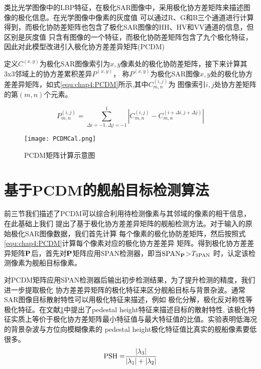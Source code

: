     类比光学图像中的LBP特征，在极化SAR图像中，采用极化协方差矩阵来描述图像的极化信息。在光学图像中像素的灰度值
    可以通过R、G和B三个通道进行计算得到，而极化协防差矩阵也包含了极化SAR图像的HH、HV和VV通道的信息，但区别是灰度值
    只含有图像的一个特征，而极化协防差矩阵包含了九个极化特征，因此对此模型改进引入极化协方差差异矩阵(PCDM)

    定义${C^{(x,y)}}$为极化SAR图像索引为$x,y$像素处的极化协防差矩阵，接下来计算其3x3邻域上的协方差累积差异$P^{(x,y)}$，
    称$P^{(x,y)}$为极化SAR图像$x,y$处的极化协方差差异矩阵，如式\ref{equ:chap4:PCDM}所示,其中$C_{m,n}^{(i,j)}$为
    图像索引$i,j$处协方差矩阵的第$(m,n)$个元素。

    \begin{equation}
        \label{equ:chap4:PCDM}
        P_{m,n}^{(i,j)} = \sum\limits_{\Delta i =  - 1,\Delta j =  - 1}^1 {\left| {C_{m,n}^{(i,j)} - C_{m,n}^{(i + \Delta i,j + \Delta j)}} \right|}
    \end{equation}

    \begin{figure}[H] %
      \centering
      \texttt{[image: PCDMCal.png]}
      \caption{PCDM矩阵计算示意图}
      \label{fig:chap4:PCDM}
    \end{figure}   
  \section{基于PCDM的舰船目标检测算法}
      前三节我们描述了PCDM可以综合利用待检测像素与其邻域的像素的相干信息，在此基础上我们
      提出了基于极化协方差差异矩阵的舰船检测方法。对于输入的原始极化SAR图像数据，我们首先计算
      每个像素的极化协防差矩阵，然后按照式\ref{equ:chap4:PCDM}计算每个像素对应的极化协方差差异
      矩阵。得到极化协方差差异矩阵$\bf{P}$后，首先对$\bf{P}$矩阵应用SPAN检测器，即当$\rm{SPAN}_{\bf{P}}$>$T_{\rm{SPAN}}$
      时，认定该检测像素为舰船目标像素。

      对PCDM矩阵应用SPAN检测器后输出初步检测结果，为了提升检测的精度，我们进一步提取极化
      协方差差异矩阵的极化特征来区分舰船目标与背景杂波。通常SAR图像目标散射特性可以用极化特征来描述，例如
      极化分解，极化反对称性等极化特征。在文献\ref{}中提出了pedestal height特征来描述目标的散射特性,
      该极化特征实质上等价于极化协方差矩阵最小特征值与最大特征值的比值。实验表明低海况的背景杂波与方位向模糊像素的
      pedestal height极化特征值比真实的舰船像素要低很多。
       \begin{equation}
          {\rm{PSH = }}\frac{{\left| {{\lambda _3}} \right|}}{{\left| {{\lambda _1}} \right| + \left| {{\lambda _2}} \right|}}
      \end{equation}

